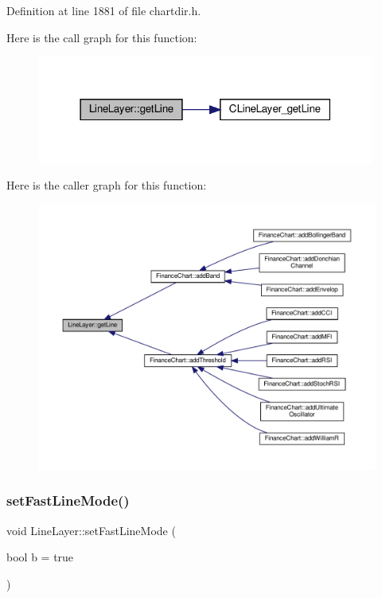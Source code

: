 Definition at line 1881 of file chartdir.\+h.

Here is the call graph for this function\+:
\nopagebreak
\begin{figure}[H]
\begin{center}
\leavevmode
\includegraphics[width=315pt]{class_line_layer_a478b1ce70dc1ddc37f675ab8d2a158fc_cgraph}
\end{center}
\end{figure}
Here is the caller graph for this function\+:
\nopagebreak
\begin{figure}[H]
\begin{center}
\leavevmode
\includegraphics[width=350pt]{class_line_layer_a478b1ce70dc1ddc37f675ab8d2a158fc_icgraph}
\end{center}
\end{figure}
\mbox{\label{class_line_layer_a8554fc14eee73c52ad9bc0ecfe753531}} 
\subsubsection{\texorpdfstring{set\+Fast\+Line\+Mode()}{setFastLineMode()}}
{\footnotesize\ttfamily void Line\+Layer\+::set\+Fast\+Line\+Mode (\begin{DoxyParamCaption}\item[{bool}]{b = {\ttfamily true} }\end{DoxyParamCaption})\hspace{0.3cm}{\ttfamily [inline]}}




